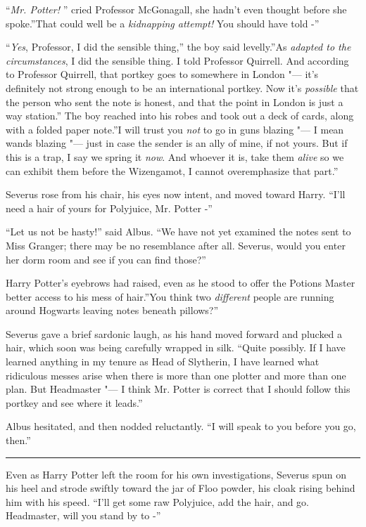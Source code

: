 ``\emph{Mr. Potter!} '' cried Professor McGonagall, she hadn't even
thought before she spoke.''That could well be a \emph{kidnapping
attempt!} You should have told -''

``\emph{Yes}, Professor, I did the sensible thing,'' the boy said
levelly.''As \emph{adapted to the circumstances}, I did the sensible
thing. I told Professor Quirrell. And according to Professor Quirrell,
that portkey goes to somewhere in London "--- it's definitely not strong
enough to be an international portkey. Now it's \emph{possible} that the
person who sent the note is honest, and that the point in London is just
a way station.'' The boy reached into his robes and took out a deck of
cards, along with a folded paper note.''I will trust you \emph{not} to
go in guns blazing "--- I mean wands blazing "--- just in case the sender is
an ally of mine, if not yours. But if this is a trap, I say we spring it
\emph{now}. And whoever it is, take them \emph{alive} so we can exhibit
them before the Wizengamot, I cannot overemphasize that part.''

Severus rose from his chair, his eyes now intent, and moved toward
Harry. ``I'll need a hair of yours for Polyjuice, Mr. Potter -''

``Let us not be hasty!'' said Albus. ``We have not yet examined the
notes sent to Miss Granger; there may be no resemblance after all.
Severus, would you enter her dorm room and see if you can find those?''

Harry Potter's eyebrows had raised, even as he stood to offer the
Potions Master better access to his mess of hair.''You think two
\emph{different} people are running around Hogwarts leaving notes
beneath pillows?''

Severus gave a brief sardonic laugh, as his hand moved forward and
plucked a hair, which soon was being carefully wrapped in silk. ``Quite
possibly. If I have learned anything in my tenure as Head of Slytherin,
I have learned what ridiculous messes arise when there is more than one
plotter and more than one plan. But Headmaster "--- I think Mr. Potter is
correct that I should follow this portkey and see where it leads.''

Albus hesitated, and then nodded reluctantly. ``I will speak to you
before you go, then.''

\begin{center}\rule{3in}{0.4pt}\end{center}

Even as Harry Potter left the room for his own investigations, Severus
spun on his heel and strode swiftly toward the jar of Floo powder, his
cloak rising behind him with his speed. ``I'll get some raw Polyjuice,
add the hair, and go. Headmaster, will you stand by to -''

